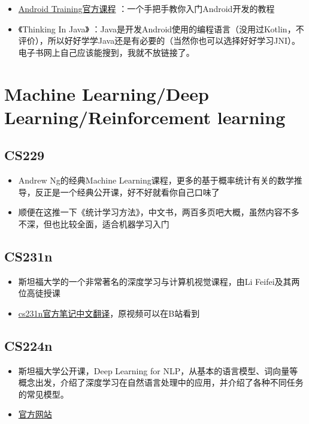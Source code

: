 \documentclass{ctexart}
\begin{document}
\begin{itemize}
	\item \href{http://hukai.me/android-training-course-in-chinese/index.html}{Android Training官方课程} ：一个手把手教你入门Android开发的教程
    \item {《Thinking In Java》} ：Java是开发Android使用的编程语言（没用过Kotlin，不评价），所以好好学学Java还是有必要的（当然你也可以选择好好学习JNI）。电子书网上自己应该能搜到，我就不放链接了。
    
\end{itemize}
\section{Machine Learning/Deep Learning/Reinforcement learning}


\subsection{CS229}

\begin{itemize}
	\item Andrew Ng的经典Machine Learning课程，更多的基于概率统计有关的数学推导，反正是一个经典公开课，好不好就看你自己口味了
	\item 顺便在这推一下《统计学习方法》，中文书，两百多页吧大概，虽然内容不多不深，但也比较全面，适合机器学习入门
\end{itemize}


\subsection{CS231n}

\begin{itemize}
	\item 斯坦福大学的一个非常著名的深度学习与计算机视觉课程，由Li Feifei及其两位高徒授课
	\item \href{https://zhuanlan.zhihu.com/p/21930884?refer=intelligentunit}{cs231n官方笔记中文翻译}，原视频可以在B站看到
\end{itemize}

\subsection{CS224n}
\begin{itemize}
	\item 斯坦福大学公开课，Deep Learning for NLP，从基本的语言模型、词向量等概念出发，介绍了深度学习在自然语言处理中的应用，并介绍了各种不同任务的常见模型。
    \item \href{http://web.stanford.edu/class/cs224n/}{官方网站}
\end{itemize}
\end{document}
